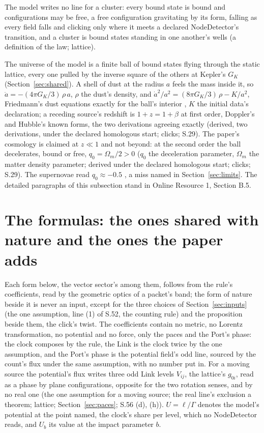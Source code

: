 \documentclass[pdflatex,sn-mathphys-num]{sn-jnl}
\theoremstyle{thmstyleone}
\theoremstyle{thmstyletwo}
\begin{document}
The model writes no line for a cluster: every bound state is bound and configurations may be free, a free configuration gravitating by its form, falling as every field falls and clicking only where it meets a declared NodeDetector's transition, and a cluster is bound states standing in one another's wells (a definition of the law; lattice).

The universe of the model is a finite ball of bound states flying through the static lattice, every one pulled by the inverse square of the others at Kepler's $G_K$ (Section~\ref{sec:shared}). A shell of dust at the radius $a$ feels the mass inside it, so $\ddot a = -(4\pi G_K / 3)\,\rho\,a$, $\rho$ the dust's density, and $\dot a^2 / a^2 = (8\pi G_K / 3)\,\rho - K / a^2$, Friedmann's dust equations exactly for the ball's interior \cite{milne}\cite{mccrea}, $K$ the initial data's declaration; a receding source's redshift is $1 + z = 1 + \beta$ at first order, Doppler's and Hubble's known forms, the two derivations agreeing exactly (derived, two derivations, under the declared homologous start; clicks; S.29). The paper's cosmology is claimed at $z \ll 1$ and not beyond: at the second order the ball decelerates, bound or free, $q_0 = \Omega_m / 2 > 0$ ($q_0$ the deceleration parameter, $\Omega_m$ the matter density parameter; derived under the declared homologous start; clicks; S.29). The supernovae read $q_0 \approx -0.5$ \cite{riess}\cite{perlmutter}\cite{pantheon}, a miss named in Section~\ref{sec:limits}. The detailed paragraphs of this subsection stand in Online Resource 1, Section B.5.
\section{The formulas: the ones shared with nature and the ones the paper adds}\label{sec:formulas}

Each form below, the vector sector's among them, follows from the rule's coefficients, read by the geometric optics of a packet's band; the form of nature beside it is never an input, except for the three choices of Section~\ref{sec:inputs} (the one assumption, line (1) of S.52, the counting rule) and the proposition beside them, the click's twist. The coefficients contain no metric, no Lorentz transformation, no potential and no force, only the paces and the Port's phase: the clock composes by the rule, the Link is the clock twice by the one assumption, and the Port's phase is the potential field's odd line, sourced by the count's flux under the same assumption, with no number put in. For a moving source the potential's flux writes three odd Link levels $V_{ij}$, the lattice's $g_{0i}$, read as a phase by plane configurations, opposite for the two rotation senses, and by no real one (the one assumption for a moving source; the real line's exclusion a theorem; lattice; Section~\ref{sec:paces}; S.56 (d), (h)). $U = \ell / \Gamma$ denotes the model's potential at the point named, the clock's share per level, which no NodeDetector reads, and $U_b$ its value at the impact parameter $b$.
\end{document}
